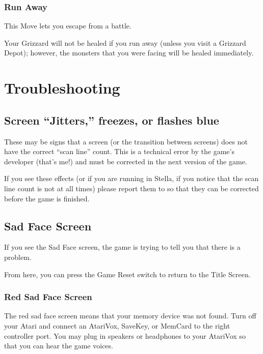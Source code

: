 \documentclass[10pt,twocolumn,openany,article]{memoir}
\begin{document}
\begin{description}
\subsection{Run Away}

This Move lets you escape from a battle.

Your  Grizzard will  not be  healed if  you run  away (unless  you visit
a  Grizzard Depot);  however, the  monsters  that you  were facing  will
be healed immediately.



\chapter{Troubleshooting}

\ifdefined\DEMO

\section{Screen ``Jitters,'' freezes, or flashes blue}

These may  be signs that  a screen  (or the transition  between screens)
does not have the correct ``scan line'' count. This is a technical error
by the game's  developer (that's me!) and must be  corrected in the next
version of the game.

If you see these effects (or if you are running in Stella, if you notice
that the scan  line count is not \ifdefined{}   \fi at
all         times)         please         report         them         to
 so  that they
can be corrected before the game is finished.

\fi

\section{Sad Face Screen}

If you  see the Sad  Face screen,  the game is  trying to tell  you that
there is a problem.

From  here,  you can  press  the  Game Reset  switch  to  return to  the
Title Screen.

\subsection{Red Sad Face Screen}

The red  sad face screen  means that your  memory device was  not found.
Turn off your Atari and connect  an AtariVox, SaveKey, or MemCard to the
right controller  port. You may plug  in speakers or headphones  to your
AtariVox so that you can hear the game voices.


\end{description}
\end{document}
